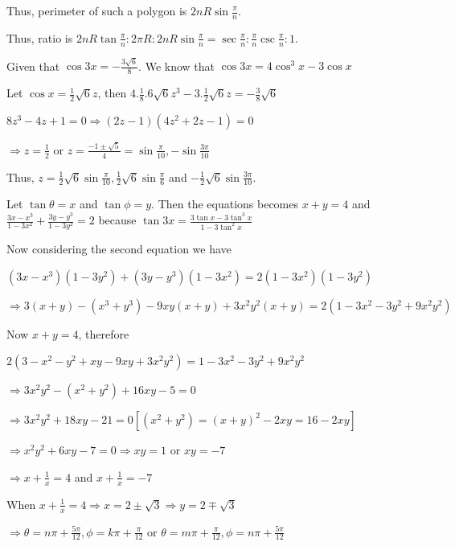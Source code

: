   Thus, perimeter of such a polygon is $2nR\sin\frac{\pi}{n}$.

  Thus, ratio is $2nR\tan\frac{\pi}{n} : 2\pi R : 2nR\sin\frac{\pi}{n} = \sec\frac{\pi}{n}
  : \frac{\pi}{n}\csc\frac{\pi}{n}: 1$.
\item Given that $\cos3x = -\frac{3\sqrt{6}}{8}$. We know that $\cos3x = 4\cos^3x - 3\cos x$

  Let $\cos x = \frac{1}{2}\sqrt{6}z$, then $4.\frac{1}{8}.6\sqrt{6}z^3 - 3.\frac{1}{2}\sqrt{6}z =
  -\frac{3}{8}\sqrt{6}$

  $8z^3 - 4z + 1 = 0\Rightarrow (2z - 1)\left(4z^2 + 2z - 1\right) = 0$

  $\Rightarrow z = \frac{1}{2}$ or $z = \frac{-1\pm\sqrt{5}}{4} = \sin\frac{\pi}{10}, -\sin\frac{3\pi}{10}$

  Thus, $z = \frac{1}{2}\sqrt{6}\sin\frac{\pi}{10}, \frac{1}{2}\sqrt{6}\sin\frac{\pi}{6}$ and
  $-\frac{1}{2}\sqrt{6}\sin\frac{3\pi}{10}$.
\item Let $\tan\theta = x$ and $\tan\phi = y$. Then the equations becomes $x + y = 4$ and $\frac{3x - x^3}{1
  - 3x^2} + \frac{3y - y^3}{1 - 3y^2} = 2$ because $\tan3x = \frac{3\tan x - 3\tan^3x}{1 - 3\tan^2x}$

  Now considering the second equation we have

  $\left(3x - x^3\right)\left(1 - 3y^2\right) + \left(3y - y^3\right)\left(1 - 3x^2\right) = 2\left(1 -
  3x^2\right)\left(1 - 3y^2\right)$

  $\Rightarrow 3(x + y) - \left(x^3 + y^3\right) - 9xy(x + y) + 3x^2y^2(x + y) = 2\left(1 - 3x^2 - 3y^2 +
  9x^2y^2\right)$

  Now $x + y = 4$, therefore

  $2\left(3 - x^2 - y^2 + xy - 9xy + 3x^2y^2\right) = 1 - 3x^2 - 3y^2 + 9x^2y^2$

  $\Rightarrow 3x^2y^2 - \left(x^2 + y^2\right) + 16xy - 5 = 0$

  $\Rightarrow 3x^2y^2 + 18xy - 21 = 0[\left(x^2 + y^2\right) = (x + y)^2 - 2xy = 16 - 2xy]$

  $\Rightarrow x^2y^2 + 6xy - 7 = 0 \Rightarrow xy = 1$ or $xy = -7$

  $\Rightarrow x + \frac{1}{x} = 4$ and $x + \frac{1}{x} = -7$

  When $x + \frac{1}{x} = 4 \Rightarrow x = 2\pm\sqrt{3}\Rightarrow y = 2\mp\sqrt{3}$

  $\Rightarrow \theta = n\pi + \frac{5\pi}{12}, \phi = k\pi + \frac{\pi}{12}$ or $\theta = m\pi
  + \frac{\pi}{12}, \phi = n\pi + \frac{5\pi}{12}$

